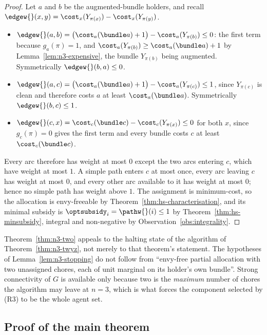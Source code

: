 \begin{proof}
Let $a$ and $b$ be the augmented-bundle holders, and recall
$\edgew{}(x,y) = \cost_x(Y_{\pi(x)}) - \cost_x(Y_{\pi(y)})$.
\begin{itemize}
  \item $\edgew{}(a,b) = \bigl(\cost_a(\bundle a) + 1\bigr) -
        \cost_a(Y_{\pi(b)}) \le 0$: the first term because $g_a(\pi) = 1$, and
        $\cost_a(Y_{\pi(b)}) \ge \cost_a(\bundle a) + 1$ by
        Lemma~\ref{lem:n3-expensive}, the bundle $Y_{\pi(b)}$ being augmented.
        Symmetrically $\edgew{}(b,a) \le 0$.
  \item $\edgew{}(a,c) = \bigl(\cost_a(\bundle a) + 1\bigr) -
        \cost_a(Y_{\pi(c)}) \le 1$, since $Y_{\pi(c)}$ is clean and therefore
        costs $a$ at least $\cost_a(\bundle a)$. Symmetrically
        $\edgew{}(b,c) \le 1$.
  \item $\edgew{}(c,x) = \cost_c(\bundle c) - \cost_c(Y_{\pi(x)}) \le 0$ for
        both $x$, since $g_c(\pi) = 0$ gives the first term and every bundle
        costs $c$ at least $\cost_c(\bundle c)$.
\end{itemize}
Every arc therefore has weight at most $0$ except the two arcs entering $c$,
which have weight at most $1$. A simple path enters $c$ at most once, every arc
leaving $c$ has weight at most $0$, and every other arc available to it has
weight at most $0$; hence no simple path has weight above $1$. The assignment
is minimum-cost, so the allocation is envy-freeable by
Theorem~\ref{thm:hs-characterisation}, and its minimal subsidy is
$\optsubsidy_i = \pathw{}(i) \le 1$ by Theorem~\ref{thm:hs-minsubsidy},
integral and non-negative by Observation~\ref{obs:integrality}.
\end{proof}

\begin{remark}
\label{rem:n3-construction}
Theorem~\ref{thm:n3-two} appeals to the halting state of the algorithm of
Theorem~\ref{thm:n3-twyz}, not merely to that theorem's statement. The hypotheses of Lemma~\ref{lem:n3-stopping} do
not follow from ``envy-free partial allocation with two unassigned chores, each
of unit marginal on its holder's own bundle''. Strong connectivity of $G$ is
available only because two is the \emph{maximum} number of chores the algorithm
may leave at $n = 3$, which is what forces the component selected by (R3) to be
the whole agent set.
\end{remark}

\subsection{Proof of the main theorem}
\label{sec:n3-assembly}

